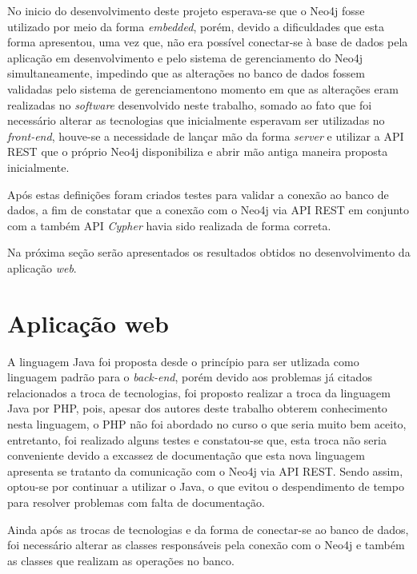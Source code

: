 \par No inicio do desenvolvimento deste projeto esperava-se que o Neo4j fosse utilizado por meio da forma \textit{embedded}, porém, devido a dificuldades que esta forma apresentou, uma vez que, não era possível conectar-se à base de dados pela aplicação em desenvolvimento e pelo sistema de gerenciamento do Neo4j simultaneamente, impedindo que as alterações no banco de dados fossem validadas pelo sistema de gerenciamentono momento em que as alterações eram realizadas no \textit{software} desenvolvido neste trabalho, somado ao fato que foi necessário alterar as tecnologias que inicialmente esperavam ser utilizadas no \textit{front-end}, houve-se a necessidade de lançar mão da forma \textit{server} e utilizar a API REST que o próprio Neo4j disponibiliza e abrir mão antiga maneira proposta inicialmente.

\par Após estas definições foram criados testes para validar a conexão ao banco de dados, a fim de constatar que a conexão com o Neo4j via API REST em conjunto com a também API \textit{Cypher} havia sido realizada de forma correta.

\par Na próxima seção serão apresentados os resultados obtidos no desenvolvimento da aplicação \textit{web}.

\section{Aplicação web}

\par A linguagem Java foi proposta desde o princípio para ser utlizada como linguagem padrão para o \textit{back-end}, porém devido aos problemas já citados relacionados a troca de tecnologias, foi proposto realizar a troca da linguagem Java por PHP, pois, apesar dos autores deste trabalho obterem conhecimento nesta linguagem, o PHP não foi abordado no curso o que seria muito bem aceito, entretanto, foi realizado alguns testes e constatou-se que, esta troca não seria conveniente devido a excassez de documentação que esta nova linguagem apresenta se tratanto da comunicação com o Neo4j via API REST. Sendo assim, optou-se por continuar a utilizar o Java, o que evitou o despendimento de tempo para resolver problemas com falta de documentação.

\par Ainda após as trocas de tecnologias e  da forma de conectar-se ao banco de dados, foi necessário alterar as classes responsáveis pela conexão com o Neo4j e também as classes que realizam as operações no banco. 

